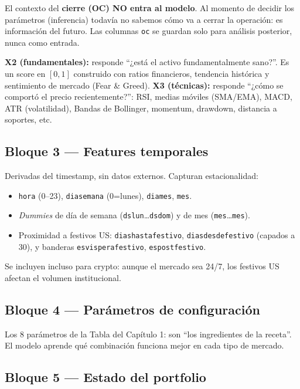 \documentclass[11pt,a4paper]{report}
\newcommand{\code}[1]{\texttt{\def\_{\textunderscore\allowbreak}#1}}
\begin{document}
\begin{nota}[¿Y el cierre (OC)?]
El contexto del \textbf{cierre (OC) NO entra al modelo}. Al momento de decidir los parámetros
(inferencia) todavía no sabemos cómo va a cerrar la operación: es información del futuro. Las
columnas \code{\_oc} se guardan solo para análisis posterior, nunca como entrada.
\end{nota}

\textbf{X2 (fundamentales):} responde ``¿está el activo fundamentalmente sano?''. Es un score
en $[0,1]$ construido con ratios financieros, tendencia histórica y sentimiento de mercado
(Fear \& Greed). \textbf{X3 (técnicas):} responde ``¿cómo se comportó el precio recientemente?'':
RSI, medias móviles (SMA/EMA), MACD, ATR (volatilidad), Bandas de Bollinger, momentum,
drawdown, distancia a soportes, etc.

\subsection{Bloque 3 — Features temporales}

Derivadas del timestamp, sin datos externos. Capturan estacionalidad:
\begin{itemize}[itemsep=1pt]
  \item \code{hora} (0--23), \code{dia\_semana} (0=lunes), \code{dia\_mes}, \code{mes}.
  \item \textit{Dummies} de día de semana (\code{ds\_lun}\ldots\code{ds\_dom}) y de mes
  (\code{mes\_1}\ldots\code{mes\_12}).
  \item Proximidad a festivos US: \code{dias\_hasta\_festivo}, \code{dias\_desde\_festivo}
  (capados a 30), y banderas \code{es\_vispera\_festivo}, \code{es\_post\_festivo}.
\end{itemize}
Se incluyen incluso para crypto: aunque el mercado sea 24/7, los festivos US afectan el volumen
institucional.

\subsection{Bloque 4 — Parámetros de configuración}

Los 8 parámetros de la Tabla del Capítulo 1: son ``los ingredientes de la receta''. El modelo
aprende qué combinación funciona mejor en cada tipo de mercado.

\subsection{Bloque 5 — Estado del portfolio}
\end{document}
